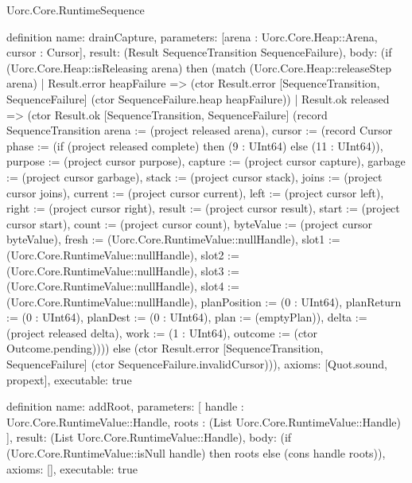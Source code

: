 \begin{lexlean}{Uorc.Core.RuntimeSequence}
\begin{semanticmodule}
definition{
  name: drainCapture,
  parameters: [arena : Uorc.Core.Heap::Arena, cursor : Cursor],
  result: (Result SequenceTransition SequenceFailure),
  body: (if (Uorc.Core.Heap::isReleasing arena) then (match (Uorc.Core.Heap::releaseStep arena)
    | Result.error heapFailure => (ctor Result.error [SequenceTransition, SequenceFailure] (ctor SequenceFailure.heap heapFailure))
    | Result.ok released => (ctor Result.ok [SequenceTransition, SequenceFailure] (record SequenceTransition {arena := (project released arena), cursor := (record Cursor {phase := (if (project released complete) then (9 : UInt64) else (11 : UInt64)), purpose := (project cursor purpose), capture := (project cursor capture), garbage := (project cursor garbage), stack := (project cursor stack), joins := (project cursor joins), current := (project cursor current), left := (project cursor left), right := (project cursor right), result := (project cursor result), start := (project cursor start), count := (project cursor count), byteValue := (project cursor byteValue), fresh := (Uorc.Core.RuntimeValue::nullHandle), slot1 := (Uorc.Core.RuntimeValue::nullHandle), slot2 := (Uorc.Core.RuntimeValue::nullHandle), slot3 := (Uorc.Core.RuntimeValue::nullHandle), slot4 := (Uorc.Core.RuntimeValue::nullHandle), planPosition := (0 : UInt64), planReturn := (0 : UInt64), planDest := (0 : UInt64), plan := (emptyPlan)}), delta := (project released delta), work := (1 : UInt64), outcome := (ctor Outcome.pending)}))) else (ctor Result.error [SequenceTransition, SequenceFailure] (ctor SequenceFailure.invalidCursor))),
  axioms: [Quot.sound, propext],
  executable: true
}

definition{
  name: addRoot,
  parameters: [
    handle : Uorc.Core.RuntimeValue::Handle,
    roots : (List Uorc.Core.RuntimeValue::Handle)
  ],
  result: (List Uorc.Core.RuntimeValue::Handle),
  body: (if (Uorc.Core.RuntimeValue::isNull handle) then roots else (cons handle roots)),
  axioms: [],
  executable: true
}


\end{semanticmodule}
\end{lexlean}
